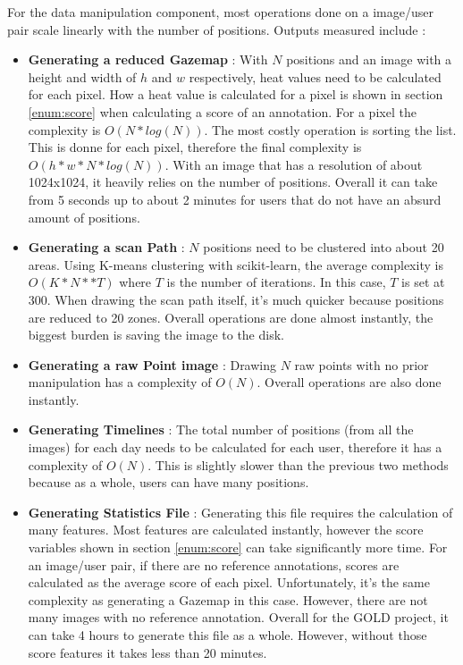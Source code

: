 \documentclass[a4paper,11pt]{report}
\numberwithin{figure}{section} %
\begin{document}
    For the data manipulation component, most operations done on a image/user pair scale linearly with the number of positions.
    Outputs measured include :
    \begin{itemize}
        \item[\textbullet] \textbf{Generating a reduced Gazemap}  : With $N$ positions and an image with a height and width of $h$ and $w$ respectively, heat values need to be calculated for each pixel.
        How a heat value is calculated for a pixel is shown in section \ref{enum:score} when calculating a score of an annotation.
        For a pixel the complexity is $O(N*log(N))$.
        The most costly operation is sorting the list.
        This is donne for each pixel, therefore the final complexity is $O(h*w*N*log(N))$.
        With an image that has a resolution of about 1024x1024, it heavily relies on the number of positions.
        Overall it can take from 5 seconds up to about 2 minutes for users that do not have an absurd amount of positions.
        \item[\textbullet] \textbf{Generating a scan Path} : $N$ positions need to be clustered into about 20 areas.
        Using K-means clustering with scikit-learn, the average complexity is $O(K*N**T)$ where $T$ is the number of iterations.
        In this case, $T$ is set at 300.
        When drawing the scan path itself, it's much quicker because positions are reduced to 20 zones.
        Overall operations are done almost instantly, the biggest burden is saving the image to the disk.
        \item[\textbullet] \textbf{Generating a raw Point image} : Drawing $N$ raw points with no prior manipulation has a complexity of $O(N)$.
        Overall operations are also done instantly.
        \item[\textbullet] \textbf{Generating Timelines} : The total number of positions (from all the images) for each day needs to be calculated for each user, therefore it has a complexity of $O(N)$.
        This is slightly slower than the previous two methods because as a whole, users can have many positions.
        \item[\textbullet] \textbf{Generating Statistics File} : Generating this file requires the calculation of many features.
        Most features are calculated instantly, however the score variables shown in section \ref{enum:score} can take significantly more time.
        For an image/user pair, if there are no reference annotations, scores are calculated as the average score of each pixel.
        Unfortunately, it's the same complexity as generating a Gazemap in this case.
        However, there are not many images with no reference annotation.
        Overall for the GOLD project, it can take 4 hours to generate this file as a whole.
        However, without those score features it takes less than 20 minutes.
    \end{itemize}
\end{document}
